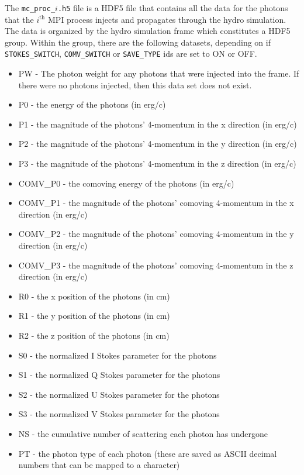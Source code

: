 \documentclass[12pt,a4paper]{article}
\begin{document}
The \texttt{mc\_proc\_$i$.h5} file is a HDF5 file that contains all the data for the photons that the $i^\mathrm{th}$ MPI process injects and propagates through the hydro simulation. The data is organized by the hydro simulation frame which constitutes a HDF5 group. Within the group, there are the following datasets, depending on if \texttt{STOKES\_SWITCH}, \texttt{COMV\_SWITCH} or \texttt{SAVE\_TYPE} ids are set to ON or OFF.
\begin{itemize}
\item PW - The photon weight for any photons that were injected into the frame. If there were no photons injected, then this data set does not exist.
\item P0 - the energy of the photons (in erg/c)
\item P1 - the magnitude of the photons' 4-momentum in the x direction (in erg/c)
\item P2 - the magnitude of the photons' 4-momentum in the y direction  (in erg/c)
\item P3 - the magnitude of the photons' 4-momentum in the z direction (in erg/c)
\item COMV\_P0 - the comoving energy of the photons (in erg/c)
\item COMV\_P1 - the magnitude of the photons' comoving 4-momentum in the x direction (in erg/c)
\item COMV\_P2 - the magnitude of the photons' comoving 4-momentum in the y direction  (in erg/c)
\item COMV\_P3 - the magnitude of the photons' comoving 4-momentum in the z direction (in erg/c)
\item R0 - the x position of the photons (in cm)
\item R1 - the y position of the photons (in cm)
\item R2 - the z position of the photons (in cm)
\item S0 - the normalized I Stokes parameter for the photons
\item S1 - the normalized Q Stokes parameter for the photons
\item S2 - the normalized U Stokes parameter for the photons
\item S3 - the normalized V Stokes parameter for the photons
\item NS - the cumulative number of scattering each photon has undergone
\item PT - the photon type of each photon (these are saved as ASCII decimal numbers that can be mapped to a character)
\end{itemize}
\end{document}
